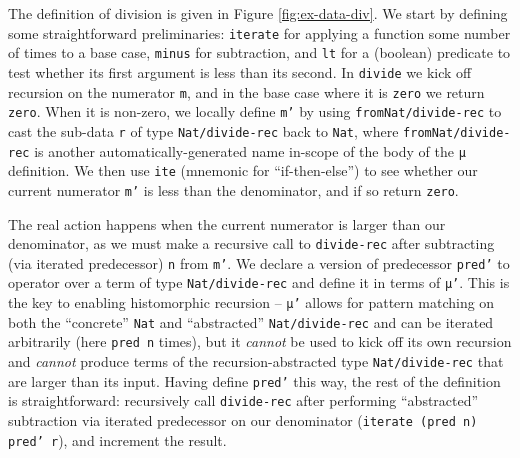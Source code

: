 \documentclass{article}
\begin{document}
The definition of division is given in Figure \ref{fig:ex-data-div}. We start by
defining some straightforward preliminaries: \texttt{iterate} for applying a
function some number of times to a base case, \texttt{minus} for subtraction,
and \texttt{lt} for a (boolean) predicate to test whether its first argument is
less than its second. In \texttt{divide} we kick off recursion on the numerator
\texttt{m}, and in the base case where it is \texttt{zero} we return
\texttt{zero}. When it is non-zero, we locally define \texttt{m'} by using
\texttt{fromNat/divide-rec} to cast the sub-data \texttt{r} of type
\texttt{Nat/divide-rec} back to \texttt{Nat}, where \texttt{fromNat/divide-rec}
is another automatically-generated name in-scope of the body of the \texttt{μ}
definition. We then use \texttt{ite} (mnemonic for ``if-then-else'') to see
whether our current numerator \texttt{m'} is less than the denominator, and if
so return \texttt{zero}.

The real action happens when the current numerator is larger than our
denominator, as we must make a recursive call to \texttt{divide-rec} after
subtracting (via iterated predecessor) \texttt{n} from \texttt{m'}. We declare a
version of predecessor \texttt{pred'} to operator over a term of type
\texttt{Nat/divide-rec} and define it in terms of \texttt{μ'}. This is the key
to enabling histomorphic recursion -- \texttt{μ'} allows for pattern matching on
both the ``concrete'' \texttt{Nat} and ``abstracted'' \texttt{Nat/divide-rec}
and can be iterated arbitrarily (here \texttt{pred n} times), but it 
\textit{cannot} be used to kick off its own recursion and \textit{cannot}
produce terms of the recursion-abstracted type \texttt{Nat/divide-rec} that are
larger than its input. Having define \texttt{pred'} this way, the rest of the
definition is straightforward: recursively call \texttt{divide-rec} after
performing ``abstracted'' subtraction via iterated predecessor on our
denominator (\texttt{iterate (pred n) pred' r}), and increment the result.
\end{document}
